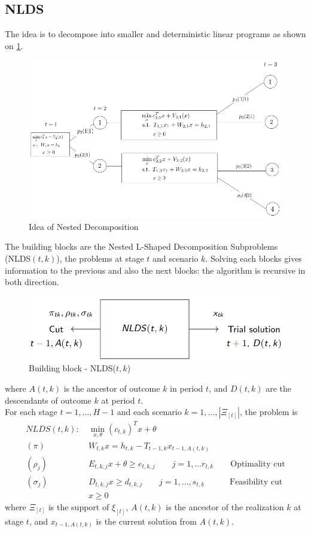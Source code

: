 \documentclass[12pt, openany]{report}
\theoremstyle{definition}
\begin{document}
\subsection{NLDS}
The idea is to decompose into smaller and deterministic linear programs as shown on \ref{fig:nested}.
\begin{figure}[H]
	\centering 
	\includegraphics[width=.7\textwidth]{img/nested.png}
	\caption{Idea of Nested Decomposition}
	\label{fig:nested}
\end{figure}
The building blocks are the Nested L-Shaped Decomposition Subproblems (NLDS$(t,k)$), the problems at stage $t$ and scenario $k$. Solving each blocks gives information to the previous and also the next blocks: the algorithm is recursive in both direction. 
\begin{figure}[H]
	\centering 
	\includegraphics[width=.7\textwidth]{img/NLDS.png}
	\caption{Building block - NLDS($t,k$)}
\end{figure}
where $A(t,k)$ is the ancestor of outcome $k$ in period $t$, and $D(t,k)$ are the descendants of outcome $k$ at period $t$. \\
For each stage $t=1,\dots,H-1$ and each scenario $k=1,\dots,|\Xi_{[t]}|$, the problem is 
\begin{equation}
	\begin{aligned}
		NLDS(t,k): \ &\min_{x,\theta} (c_{t,k})^Tx+\theta \\
		(\pi) \quad & W_{t,k}x = h_{t,k}-T_{t-1,k}x_{t-1, A(t,k)} \\
		(\rho_j) \quad & E_{t,k,j}x + \theta \ge e_{t,k,j} \qquad j=1, \dots r_{t,k} \qquad \text{Optimality cut}\\
		(\sigma_j) \quad & D_{t,k,j} x\ge d_{t,k,j}\qquad j=1,\dots, s_{t,k} \qquad \quad \text{Feasibility cut}\\
		&x\ge 0
	\end{aligned}
\end{equation}
where $\Xi_{[t]}$ is the support of $\xi_{[t]}$, $A(t,k)$ is the ancestor of the realization $k$ at stage $t$, and $x_{t-1, A(t,k)}$ is the current solution from $A(t,k)$. 
\end{document}

